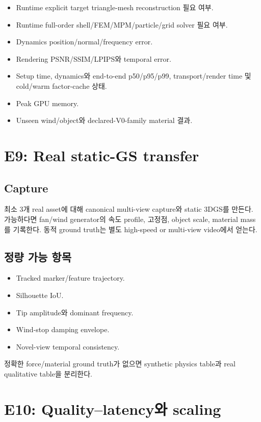 \documentclass[11pt,a4paper]{article}
\begin{document}
\begin{itemize}[leftmargin=1.5em]
  \item Runtime explicit target triangle-mesh reconstruction 필요 여부.
  \item Runtime full-order shell/FEM/MPM/particle/grid solver 필요 여부.
  \item Dynamics position/normal/frequency error.
  \item Rendering PSNR/SSIM/LPIPS와 temporal error.
  \item Setup time, dynamics와 end-to-end p50/p95/p99,
  transport/render time 및 cold/warm factor-cache 상태.
  \item Peak GPU memory.
  \item Unseen wind/object와 declared-V0-family material 결과.
\end{itemize}

\section{E9: Real static-GS transfer}

\subsection*{Capture}

최소 3개 real asset에 대해 canonical multi-view capture와 static 3DGS를 만든다.
가능하다면 fan/wind generator의 속도 profile,
고정점, object scale, material mass를 기록한다.
동적 ground truth는 별도 high-speed or multi-view video에서 얻는다.

\subsection*{정량 가능 항목}

\begin{itemize}[leftmargin=1.5em]
  \item Tracked marker/feature trajectory.
  \item Silhouette IoU.
  \item Tip amplitude와 dominant frequency.
  \item Wind-stop damping envelope.
  \item Novel-view temporal consistency.
\end{itemize}

정확한 force/material ground truth가 없으면
synthetic physics table과 real qualitative table을 분리한다.

\section{E10: Quality--latency와 scaling}
\end{document}
